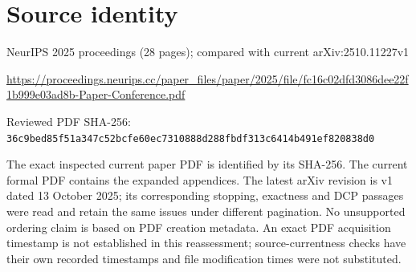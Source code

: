 \documentclass[11pt]{article}
\begin{document}
\section*{Source identity}

NeurIPS 2025 proceedings (28 pages); compared with current arXiv:2510.11227v1

\url{https://proceedings.neurips.cc/paper_files/paper/2025/file/fc16c02dfd3086dee22f1b999e03ad8b-Paper-Conference.pdf}

Reviewed PDF SHA-256: \nolinkurl{36c9bed85f51a347c52bcfe60ec7310888d288fbdf313c6414b491ef820838d0}

The exact inspected current paper PDF is identified by its SHA-256. The current formal PDF contains the expanded appendices. The latest arXiv revision is v1 dated 13 October 2025; its corresponding stopping, exactness and DCP passages were read and retain the same issues under different pagination. No unsupported ordering claim is based on PDF creation metadata. An exact PDF acquisition timestamp is not established in this reassessment; source-currentness checks have their own recorded timestamps and file modification times were not substituted.
\end{document}
